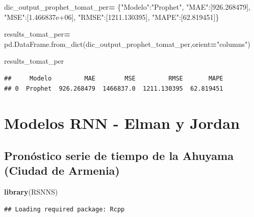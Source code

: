 \documentclass[
]{book}
\newenvironment{Shaded}{\begin{snugshade}}{\end{snugshade}}
\newcommand{\FloatTok}[1]{\textcolor[rgb]{0.00,0.00,0.81}{#1}}
\newcommand{\FunctionTok}[1]{\textcolor[rgb]{0.13,0.29,0.53}{\textbf{#1}}}
\newcommand{\NormalTok}[1]{#1}
\newcommand{\OperatorTok}[1]{\textcolor[rgb]{0.81,0.36,0.00}{\textbf{#1}}}
\newcommand{\StringTok}[1]{\textcolor[rgb]{0.31,0.60,0.02}{#1}}
\begin{document}
\begin{Shaded}
\begin{Highlighting}[]

\NormalTok{dic\_output\_prophet\_tomat\_per}\OperatorTok{=}\NormalTok{ \{}\StringTok{"Modelo"}\NormalTok{:}\StringTok{"Prophet"}\NormalTok{,}
                 \StringTok{"MAE"}\NormalTok{:[}\FloatTok{926.268479}\NormalTok{],}
                 \StringTok{"MSE"}\NormalTok{:[}\FloatTok{1.466837e+06}\NormalTok{],}
                 \StringTok{"RMSE"}\NormalTok{:[}\FloatTok{1211.130395}\NormalTok{],}
                 \StringTok{"MAPE"}\NormalTok{:[}\FloatTok{62.819451}\NormalTok{]\}}

\NormalTok{results\_tomat\_per}\OperatorTok{=}\NormalTok{ pd.DataFrame.from\_dict(dic\_output\_prophet\_tomat\_per,orient}\OperatorTok{=}\StringTok{"columns"}\NormalTok{)}

\NormalTok{results\_tomat\_per}
\end{Highlighting}
\end{Shaded}

\begin{verbatim}
##     Modelo         MAE        MSE         RMSE       MAPE
## 0  Prophet  926.268479  1466837.0  1211.130395  62.819451
\end{verbatim}

\hypertarget{modelos-rnn---elman-y-jordan}{%
\section{Modelos RNN - Elman y Jordan}\label{modelos-rnn---elman-y-jordan}}

\hypertarget{pronuxf3stico-serie-de-tiempo-de-la-ahuyama-ciudad-de-armenia-3}{%
\subsection{Pronóstico serie de tiempo de la Ahuyama (Ciudad de Armenia)}\label{pronuxf3stico-serie-de-tiempo-de-la-ahuyama-ciudad-de-armenia-3}}

\begin{Shaded}
\begin{Highlighting}[]
\FunctionTok{library}\NormalTok{(RSNNS)}
\end{Highlighting}
\end{Shaded}

\begin{verbatim}
## Loading required package: Rcpp
\end{verbatim}
\end{document}
